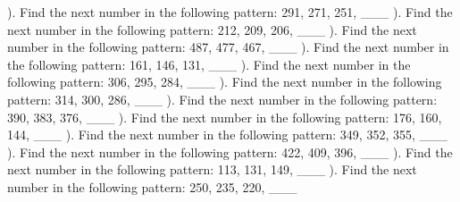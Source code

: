 \documentclass{article}%
\begin{document}
). Find the next number in the following pattern: 291, 271, 251, \_\_\_%
\newline%
\newline%
). Find the next number in the following pattern: 212, 209, 206, \_\_\_%
\newline%
\newline%
). Find the next number in the following pattern: 487, 477, 467, \_\_\_%
\newline%
\newline%
). Find the next number in the following pattern: 161, 146, 131, \_\_\_%
\newline%
\newline%
). Find the next number in the following pattern: 306, 295, 284, \_\_\_%
\newline%
\newline%
). Find the next number in the following pattern: 314, 300, 286, \_\_\_%
\newline%
\newline%
). Find the next number in the following pattern: 390, 383, 376, \_\_\_%
\newline%
\newline%
). Find the next number in the following pattern: 176, 160, 144, \_\_\_%
\newline%
\newline%
). Find the next number in the following pattern: 349, 352, 355, \_\_\_%
\newline%
\newline%
). Find the next number in the following pattern: 422, 409, 396, \_\_\_%
\newline%
\newline%
). Find the next number in the following pattern: 113, 131, 149, \_\_\_%
\newline%
\newline%
). Find the next number in the following pattern: 250, 235, 220, \_\_\_%
\end{document}
